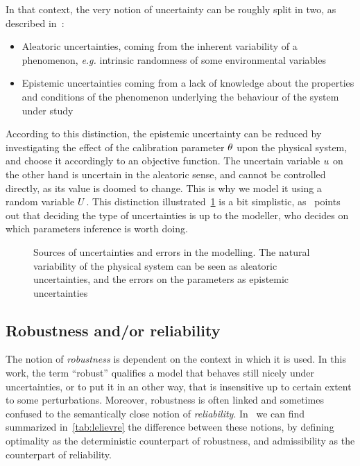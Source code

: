 \documentclass[../../Main_ManuscritThese.tex]{subfiles}
\begin{document}
In that context, the very notion of uncertainty can be roughly split
in two, as described in~\cite{walker_defining_2003}:
\begin{itemize}
\item Aleatoric uncertainties, coming from the inherent variability of a phenomenon, \emph{e.g.} intrinsic randomness of some environmental variables
\item Epistemic uncertainties coming from a lack of knowledge about the properties and conditions of the phenomenon underlying the behaviour of the system under study
\end{itemize}
According to this distinction,  the epistemic uncertainty can be reduced by investigating the effect of the calibration parameter $\theta$ upon the physical system, and choose it accordingly to an objective function.
The uncertain variable $u$ on the other hand is uncertain in the aleatoric sense, and cannot be controlled directly, as its value is doomed to change. This is why we model it using a random variable $U$. This distinction illustrated~\cref{fig:sources_uncertainties} is a bit simplistic, as~\cite{kiureghian_aleatory_2009} points out that deciding the type of uncertainties is up to the modeller, who decides on which parameters inference is worth doing.

\begin{figure}[ht]
  \begin{center}
  \resizebox{\linewidth}{!}
  {
      
    }
    \end{center}
  \caption[Sources of uncertainties and errors in the modelling]{\label{fig:sources_uncertainties} Sources of uncertainties and errors in the modelling. The natural variability of the physical system can be seen as aleatoric uncertainties, and the errors on the parameters as epistemic uncertainties}
\end{figure}

\subsection{Robustness and/or reliability}
The notion of \emph{robustness} is dependent on the context in which it is used. In this work, the term ``robust'' qualifies a model that behaves still nicely under uncertainties, or to put it in an other way, that is insensitive up to certain extent to some perturbations.
Moreover, robustness is often linked and sometimes confused to the semantically close notion of \emph{reliability}. In~\cite{lelievre_consideration_2016} we can find summarized in~\cref{tab:lelievre} the difference between these notions, by defining optimality as the deterministic counterpart of robustness, and admissibility as the counterpart of reliability.
\end{document}
